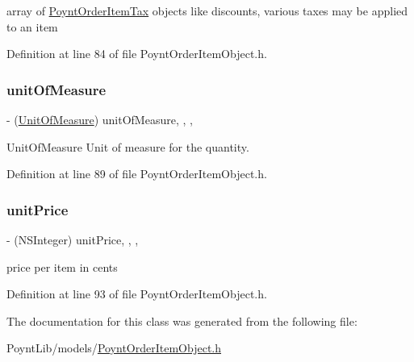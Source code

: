 array of \hyperlink{interface_poynt_order_item_tax}{Poynt\+Order\+Item\+Tax} objects  like discounts, various taxes may be applied to an item 



Definition at line 84 of file Poynt\+Order\+Item\+Object.\+h.

\hypertarget{interface_poynt_order_item_object_a8381a2b60fb912bab67a5218ba3ad058}{}\label{interface_poynt_order_item_object_a8381a2b60fb912bab67a5218ba3ad058} 
\subsubsection{\texorpdfstring{unit\+Of\+Measure}{unitOfMeasure}}
{\footnotesize\ttfamily -\/ (\hyperlink{_poynt_order_item_object_8h_a7a5dd044bd57739d1d1b3e3565fbac25}{Unit\+Of\+Measure}) unit\+Of\+Measure\hspace{0.3cm}{\ttfamily [read]}, {\ttfamily [write]}, {\ttfamily [nonatomic]}, {\ttfamily [assign]}}



Unit\+Of\+Measure  Unit of measure for the quantity. 



Definition at line 89 of file Poynt\+Order\+Item\+Object.\+h.

\hypertarget{interface_poynt_order_item_object_a4655acbe158688f583828a9a3b61a6aa}{}\label{interface_poynt_order_item_object_a4655acbe158688f583828a9a3b61a6aa} 
\subsubsection{\texorpdfstring{unit\+Price}{unitPrice}}
{\footnotesize\ttfamily -\/ (N\+S\+Integer) unit\+Price\hspace{0.3cm}{\ttfamily [read]}, {\ttfamily [write]}, {\ttfamily [nonatomic]}, {\ttfamily [assign]}}



price per item in cents 



Definition at line 93 of file Poynt\+Order\+Item\+Object.\+h.



The documentation for this class was generated from the following file\+:\begin{DoxyCompactItemize}
\item 
Poynt\+Lib/models/\hyperlink{_poynt_order_item_object_8h}{Poynt\+Order\+Item\+Object.\+h}\end{DoxyCompactItemize}
